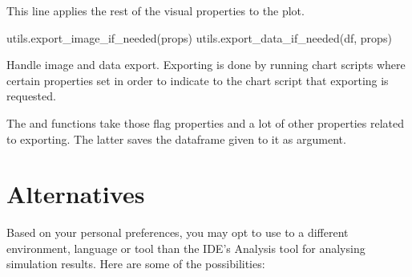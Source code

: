 This line applies the rest of the visual properties to the plot.

\begin{python}
utils.export_image_if_needed(props)
utils.export_data_if_needed(df, props)
\end{python}

Handle image and data export. Exporting is done by running chart scripts where
certain properties set in order to indicate to the chart script that exporting is requested.

The  and  functions
take those flag properties and a lot of other properties related to exporting.
The latter saves the dataframe given to it as argument.




\section{Alternatives}
\label{sec:ana-sim:result-analysis-alternatives}

Based on your personal preferences, you may opt to use to a different
environment, language or tool than the IDE's Analysis tool for analysing
simulation results. Here are some of the possibilities:

